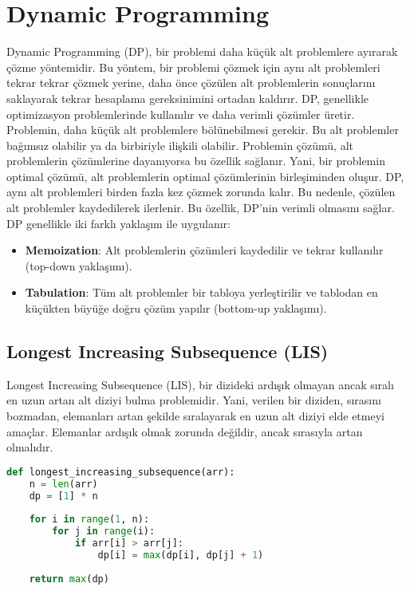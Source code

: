\section{Dynamic Programming}

Dynamic Programming (DP), bir problemi daha küçük alt problemlere ayırarak çözme yöntemidir. Bu yöntem, bir problemi çözmek için aynı alt problemleri tekrar tekrar çözmek yerine, daha önce çözülen alt problemlerin sonuçlarını saklayarak tekrar hesaplama gereksinimini ortadan kaldırır. DP, genellikle optimizasyon problemlerinde kullanılır ve daha verimli çözümler üretir. Problemin, daha küçük alt problemlere bölünebilmesi gerekir. Bu alt problemler bağımsız olabilir ya da birbiriyle ilişkili olabilir. Problemin çözümü, alt problemlerin çözümlerine dayanıyorsa bu özellik sağlanır. Yani, bir problemin optimal çözümü, alt problemlerin optimal çözümlerinin birleşiminden oluşur. DP, aynı alt problemleri birden fazla kez çözmek zorunda kalır. Bu nedenle, çözülen alt problemler kaydedilerek ilerlenir. Bu özellik, DP'nin verimli olmasını sağlar. DP genellikle iki farklı yaklaşım ile uygulanır:

\begin{itemize}
    \item \textbf{Memoization}: Alt problemlerin çözümleri kaydedilir ve tekrar kullanılır (top-down yaklaşımı).
    \item \textbf{Tabulation}: Tüm alt problemler bir tabloya yerleştirilir ve tablodan en küçükten büyüğe doğru çözüm yapılır (bottom-up yaklaşımı).
\end{itemize}

\newpage

\subsection{Longest Increasing Subsequence (LIS)}

Longest Increasing Subsequence (LIS), bir dizideki ardışık olmayan ancak sıralı en uzun artan alt diziyi bulma problemidir. Yani, verilen bir diziden, sırasını bozmadan, elemanları artan şekilde sıralayarak en uzun alt diziyi elde etmeyi amaçlar. Elemanlar ardışık olmak zorunda değildir, ancak sırasıyla artan olmalıdır.

\begin{lstlisting}[language=Python]
def longest_increasing_subsequence(arr):
    n = len(arr)
    dp = [1] * n 
    
    for i in range(1, n):
        for j in range(i):
            if arr[i] > arr[j]:
                dp[i] = max(dp[i], dp[j] + 1)
    
    return max(dp)
\end{lstlisting}

